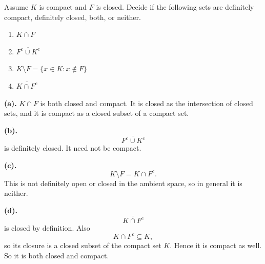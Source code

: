 \begin{problem}{
    Assume $K$ is compact and $F$ is closed.
    Decide if the following sets are definitely compact, definitely closed, both, or neither.
    \begin{enumerate}[label={(\alph*)}]
	\item $K\cap F$
    \item $\overline{F^c \cup K^c}$
    \item $K\setminus F = \{x\in K : x\notin F\}$
    \item $\overline{K\cap F^c}$
    \end{enumerate}
}
    \textbf{(a).}
    $K\cap F$ is both closed and compact.
    It is closed as the intersection of closed sets, and it is compact as a closed subset of a compact set.

    \textbf{(b).}
    \[
        \overline{F^c\cup K^c}
    \]
    is definitely closed.
    It need not be compact.

    \textbf{(c).}
    \[
        K\setminus F = K\cap F^c.
    \]
    This is not definitely open or closed in the ambient space, so in general it is neither.

    \textbf{(d).}
    \[
        \overline{K\cap F^c}
    \]
    is closed by definition.
    Also
    \[
        K\cap F^c\subseteq K,
    \]
    so its closure is a closed subset of the compact set $K$.
    Hence it is compact as well.
    So it is both closed and compact.
\end{problem}

